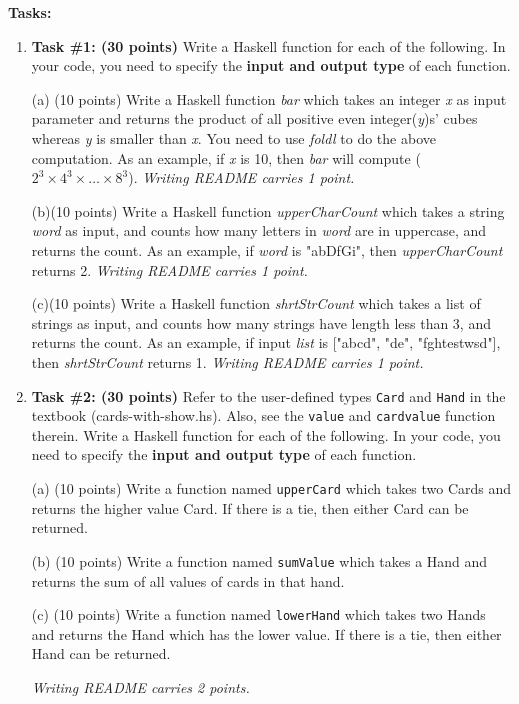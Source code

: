 \documentclass[paper=letter, fontsize=11pt]{scrartcl} %
\begin{document}
    \textbf{Tasks:}
    \begin{enumerate}

        \item \textbf{Task \#1: (30 points)} Write a Haskell function for each of the following. In your code, you need to specify the \textbf{input and output type} of each function. 

(a) (10 points) Write a Haskell function \emph{bar} which takes an integer \emph{x} as input parameter 
and returns the product of all positive even integer(\emph{y})s' cubes whereas \emph{y} is smaller than \emph{x}. 
You need to use \emph{foldl} to do the above computation. 
As an example, if \emph{x} is 10, then \emph{bar} will compute (${2^3} \times {4^3} \times \ldots \times {8^3}$).
\emph{Writing README carries 1 point.}


(b)(10 points) Write a Haskell function \emph{upperCharCount} which takes a string \emph{word} as input, 
and counts how many letters in \emph{word} are in uppercase, and returns the count. 
As an example, if \emph{word} is "abDfGi", then \emph{upperCharCount} returns 2. 
\emph{Writing README carries 1 point.}

(c)(10 points) Write a Haskell function \emph{shrtStrCount} which takes a list of strings as input, and 
counts how many strings have length less than 3, and returns the count. 
As an example, if input \emph{list} is ["abcd", "de", "fghtestwsd"], then \emph{shrtStrCount} returns 1. 
\emph{Writing README carries 1 point.}
 
       \item \textbf{Task \#2: (30 points)} Refer to the user-defined types \texttt{Card} and \texttt{Hand} in the textbook (cards-with-show.hs).
Also, see the \texttt{value} and \texttt{cardvalue} function therein. Write a Haskell function for each of the following. 
In your code, you need to specify the \textbf{input and output type} of each function. 

(a) (10 points) Write a function named \texttt{upperCard} which takes two Cards and returns the higher value Card. If there is a tie, then either Card can be returned.

(b) (10 points) Write a function named \texttt{sumValue} which takes a Hand and returns the sum of all values of cards in that hand.

(c) (10 points) Write a function named \texttt{lowerHand} which takes two Hands and returns the Hand which has the lower value. If there is a tie, then either Hand can be returned.

\emph{Writing README carries 2 points.}

    
    \end{enumerate}
\end{document}
